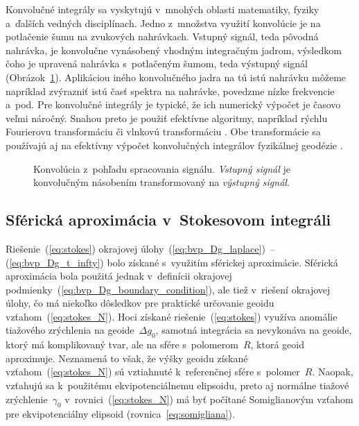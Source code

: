 \documentclass[a4paper,12pt]{book}
\begin{document}
Konvolučné integrály sa vyskytujú v~mnohých oblasti matematiky, fyziky 
a~ďalších vedných disciplínach.  Jedno z~množstva využití konvolúcie je na 
potlačenie šumu na zvukových nahrávkach.  Vstupný signál, teda pôvodná 
nahrávka, je konvolučne vynásobený vhodným integračným jadrom, výsledkom čoho 
je upravená nahrávka s~potlačeným šumom, teda výstupný signál 
(Obrázok~\ref{fig:convolution}).  Aplikáciou iného konvolučného jadra na tú 
istú nahrávku môžeme napríklad zvýrazniť istú časť spektra na nahrávke, 
povedzme nízke frekvencie a~pod.  Pre konvolučné integrály je typické, že ich 
numerický výpočet je časovo veľmi náročný.  Snahou preto je použiť efektívne 
algoritmy, napríklad rýchlu Fourierovu transformáciu 
\parencite[napríklad][]{PressNumericalRecipes} či vlnkovú transformáciu 
\parencite[napríklad][]{KellerWavelets}.  Obe transformácie sa používajú aj na 
efektívny výpočet konvolučných integrálov fyzikálnej geodézie \parencite[pozri 
napríklad][]{Forsberg1984,Freeden1998a,SansoGeoidDetermination}.

\begin{figure}[bt]
\centering

\caption{Konvolúcia z~pohľadu spracovania signálu.  \textit{Vstupný signál} je 
konvolučným násobením transformovaný na \textit{výstupný signál}.}
\label{fig:convolution}
\end{figure}


\subsection{Sférická aproximácia v~Stokesovom integráli}
\label{sec:stokes_spherical_approximation}

Riešenie~(\ref{eq:stokes}) okrajovej úlohy~(\ref{eq:bvp_Dg_laplace})~-- 
(\ref{eq:bvp_Dg_t_infty}) bolo získané s~využitím sférickej aproximácie.  
Sférická aproximácia bola použitá jednak v~definícii okrajovej 
podmienky~(\ref{eq:bvp_Dg_boundary_condition}), ale tiež v~riešení okrajovej 
úlohy, čo má niekoľko dôsledkov pre praktické určovanie geoidu 
vzťahom~(\ref{eq:stokes_N}).  Hoci získané riešenie~(\ref{eq:stokes}) využíva 
anomálie tiažového zrýchlenia na geoide~$\Delta g_0$, samotná integrácia sa 
nevykonáva na geoide, ktorý má komplikovaný tvar, ale na sfére s~polomerom~$R$, 
ktorá geoid aproximuje.  Neznamená to však, že výšky geoidu získané 
vzťahom~(\ref{eq:stokes_N}) sú vztiahnuté k~referenčnej sfére s~polomer~$R$.  
Naopak, vzťahujú sa k~použitému ekvipotenciálnemu elipsoidu, preto aj normálne 
tiažové zrýchlenie~$\gamma_0$ v~rovnici~(\ref{eq:stokes_N}) má byť počítané 
Somiglianovým vzťahom pre ekvipotenciálny elipsoid 
(rovnica~\ref{eq:somigliana}).
\end{document}
